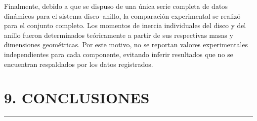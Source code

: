 \documentclass[11pt,a4paper]{article}
\newcommand{\sectionline}{%
    \vspace{-0.6em}
    \noindent\rule{\textwidth}{0.5pt}
    \vspace{0.5em}
}
\begin{document}
Finalmente, debido a que se dispuso de una única serie completa de datos
dinámicos para el sistema disco--anillo, la comparación experimental se
realizó para el conjunto completo. Los momentos de inercia individuales
del disco y del anillo fueron determinados teóricamente a partir de sus
respectivas masas y dimensiones geométricas. Por este motivo, no se
reportan valores experimentales independientes para cada componente,
evitando inferir resultados que no se encuentran respaldados por los
datos registrados.


\newpage
\section*{9. CONCLUSIONES}
\sectionline
\end{document}
